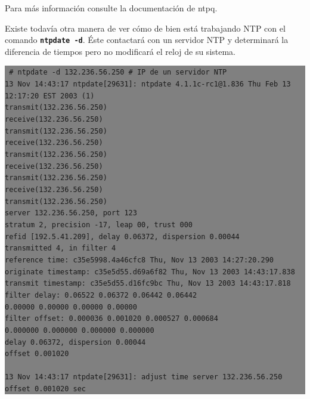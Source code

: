 \documentclass[12pt]{article}
\begin{document}
Para más información consulte la documentación de ntpq. 
	
Existe todavía otra manera de ver cómo de bien está trabajando NTP con 
el comando \texttt{\textbf{ntpdate -d}}. Éste contactará con un servidor NTP y
determinará la diferencia de tiempos pero no modificará el reloj de su sistema.

\colorbox{grey}{\parbox[t]{0.95\linewidth}{ \vspace*{0.5cm} {\tt 
\# ntpdate -d 132.236.56.250 \# IP de un servidor NTP \\
13 Nov 14:43:17 ntpdate[29631]: ntpdate 4.1.1c-rc1@1.836 Thu Feb 13 12:17:20 EST 2003 (1)\\
transmit(132.236.56.250)\\
receive(132.236.56.250)\\
transmit(132.236.56.250)\\
receive(132.236.56.250)\\
transmit(132.236.56.250)\\
receive(132.236.56.250)\\
transmit(132.236.56.250)\\
receive(132.236.56.250)\\
transmit(132.236.56.250)\\
server 132.236.56.250, port 123\\
stratum 2, precision -17, leap 00, trust 000\\
refid [192.5.41.209], delay 0.06372, dispersion 0.00044\\
transmitted 4, in filter 4\\
reference time:    c35e5998.4a46cfc8  Thu, Nov 13 2003 14:27:20.290\\
originate timestamp: c35e5d55.d69a6f82  Thu, Nov 13 2003 14:43:17.838\\
transmit timestamp:  c35e5d55.d16fc9bc  Thu, Nov 13 2003 14:43:17.818\\
filter delay:  0.06522  0.06372  0.06442  0.06442\\
         0.00000  0.00000  0.00000  0.00000\\
filter offset: 0.000036 0.001020 0.000527 0.000684\\
         0.000000 0.000000 0.000000 0.000000\\
delay 0.06372, dispersion 0.00044\\
offset 0.001020\\
\\
13 Nov 14:43:17 ntpdate[29631]: adjust time server 132.236.56.250 offset 0.001020 sec\\
 } \vspace*{0.5cm} } } 
\end{document}
